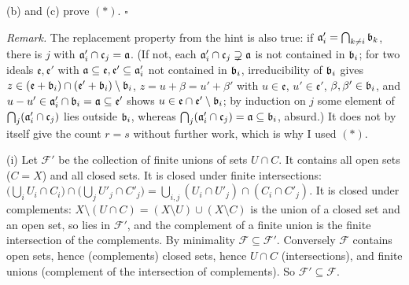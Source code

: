 \documentclass[11pt]{article}
\begin{document}
(b) and (c) prove $(*)$. \hfill$\square$

\emph{Remark.} The replacement property from the hint is also true: if $\mathfrak a_i'=\bigcap_{k\ne i}\mathfrak b_k$, there is $j$ with $\mathfrak a_i'\cap\mathfrak c_j=\mathfrak a$. (If not, each $\mathfrak a_i'\cap\mathfrak c_j\supsetneq\mathfrak a$ is not contained in $\mathfrak b_i$; for two ideals $\mathfrak e,\mathfrak e'$ with $\mathfrak a\subseteq\mathfrak e,\mathfrak e'\subseteq\mathfrak a_i'$ not contained in $\mathfrak b_i$, irreducibility of $\mathfrak b_i$ gives $z\in(\mathfrak e+\mathfrak b_i)\cap(\mathfrak e'+\mathfrak b_i)\setminus\mathfrak b_i$, $z=u+\beta=u'+\beta'$ with $u\in\mathfrak e$, $u'\in\mathfrak e'$, $\beta,\beta'\in\mathfrak b_i$, and $u-u'\in\mathfrak a_i'\cap\mathfrak b_i=\mathfrak a\subseteq\mathfrak e'$ shows $u\in\mathfrak e\cap\mathfrak e'\setminus\mathfrak b_i$; by induction on $j$ some element of $\bigcap_j(\mathfrak a_i'\cap\mathfrak c_j)$ lies outside $\mathfrak b_i$, whereas $\bigcap_j(\mathfrak a_i'\cap\mathfrak c_j)=\mathfrak a\subseteq\mathfrak b_i$, absurd.) It does not by itself give the count $r=s$ without further work, which is why I used $(*)$.

\pf
(i) Let $\mathcal F'$ be the collection of finite unions of sets $U\cap C$. It contains all open sets ($C=X$) and all closed sets. It is closed under finite intersections: $\bigl(\bigcup_i U_i\cap C_i\bigr)\cap\bigl(\bigcup_jU'_j\cap C'_j\bigr)=\bigcup_{i,j}(U_i\cap U'_j)\cap(C_i\cap C'_j)$. It is closed under complements: $X\setminus(U\cap C)=(X\setminus U)\cup(X\setminus C)$ is the union of a closed set and an open set, so lies in $\mathcal F'$, and the complement of a finite union is the finite intersection of the complements. By minimality $\mathcal F\subseteq\mathcal F'$. Conversely $\mathcal F$ contains open sets, hence (complements) closed sets, hence $U\cap C$ (intersections), and finite unions (complement of the intersection of complements). So $\mathcal F'\subseteq\mathcal F$.
\end{document}
